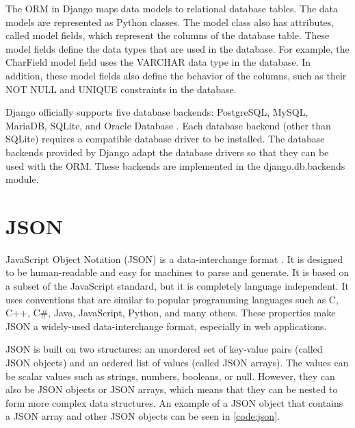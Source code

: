 The ORM in Django maps data models to relational database tables. The data
models are represented as Python classes. The model class also has attributes,
called model fields, which represent the columns of the database table. These
model fields define the data types that are used in the database. For example,
the CharField model field uses the VARCHAR data type in the database. In
addition, these model fields also define the behavior of the columns, such as
their NOT NULL and UNIQUE constraints in the database.

Django officially supports five database backends: PostgreSQL, MySQL, MariaDB,
SQLite, and Oracle Database \cite{django:databases}. Each database backend
(other than SQLite) requires a compatible database driver to be installed. The
database backends provided by Django adapt the database drivers so that they
can be used with the ORM. These backends are implemented in the
django.db.backends module.

\section{JSON}

JavaScript Object Notation (JSON) is a data-interchange format
\cite{ecma:json}. It is designed to be human-readable and easy for machines to
parse and generate. It is based on a subset of the JavaScript standard, but it
is completely language independent. It uses conventions that are similar to
popular programming languages such as C, C++, C\#, Java, JavaScript, Python,
and many others. These properties make JSON a widely-used data-interchange
format, especially in web applications.

JSON is built on two structures: an unordered set of key-value pairs (called
JSON objects) and an ordered list of values (called JSON arrays). The values
can be scalar values such as strings, numbers, booleans, or null. However, they
can also be JSON objects or JSON arrays, which means that they can be nested
to form more complex data structures. An example of a JSON object that contains
a JSON array and other JSON objects can be seen in \autoref{code:json}.



